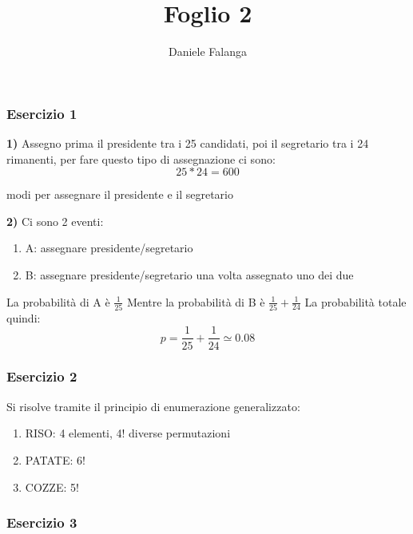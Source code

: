 \documentclass[12pt]{article}
\title{\textbf{Foglio 2}}
\author{Daniele Falanga}
\date{}
\begin{document}
\maketitle

\subsubsection*{Esercizio 1}
{\bf{1)}} 
Assegno prima il presidente tra i 25 candidati, poi il segretario tra i
24 rimanenti, per fare questo tipo di assegnazione ci sono: 
\[
25*24 = 600     
\]

modi per assegnare il presidente e il segretario

{\bf{2)}}
Ci sono 2 eventi: 
\begin{enumerate}
    \item A: assegnare presidente/segretario  
    \item B: assegnare presidente/segretario una volta assegnato uno dei due
\end{enumerate}
La probabilità di A è \(\frac{1}{25}\) 
\newline
Mentre la probabilità di B è \(\frac{1}{25} + \frac{1}{24}\) 
La probabilità totale quindi: 
\[
    p = \frac{1}{25} + \frac{1}{24} \simeq 0.08
\]

\subsubsection*{Esercizio 2}
Si risolve tramite il principio di enumerazione generalizzato: 
\begin{enumerate}
    \item RISO: 4 elementi, 4! diverse permutazioni 
    \item PATATE: 6!
    \item COZZE: 5!
\end{enumerate}

\subsubsection*{Esercizio 3}
\end{document}
